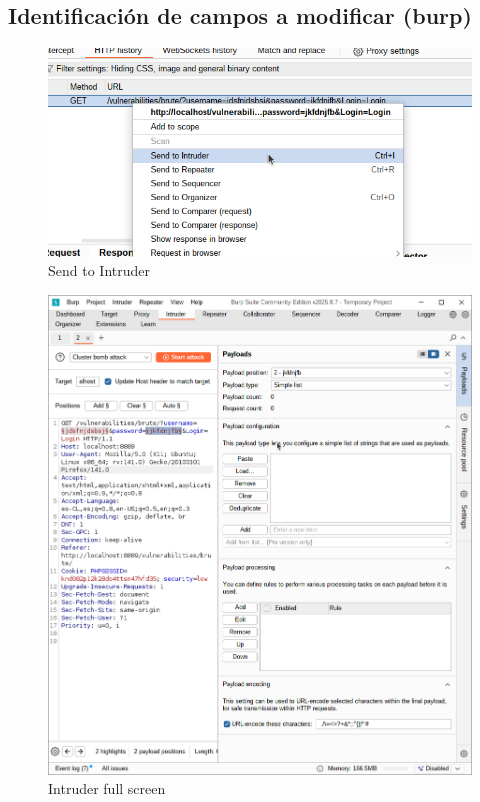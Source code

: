 \documentclass[letter,12pt]{article}
\begin{document}
\subsection{Identificación de campos a modificar (burp)}
\begin{figure}
    \centering
    \includegraphics[width=1\linewidth]{identificaryobtenercamposburp/Captura desde 2025-10-01 23-19-38.png}
    \caption{Send to Intruder}
    \label{fig:sendtointuder}
\end{figure}
\begin{figure}
    \centering
    \includegraphics[width=1\linewidth]{identificaryobtenercamposburp/Captura desde 2025-10-01 23-20-22.png}
    \caption{Intruder full screen}
    \label{fig:intruder}
\end{figure}
\end{document}
